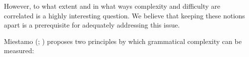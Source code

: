 \documentclass[output=collectionpaper]{langsci/langscibook}
\begin{document}
%
However, to what extent and in what ways complexity and difficulty are correlated is a highly interesting question. We believe that keeping these notions apart is a prerequisite for adequately addressing this issue.

Miestamo (\citealt*{Miestamo2006a}; \citealt*{Miestamo2008}) proposes two principles by which grammatical complexity can be measured:
\end{document}
